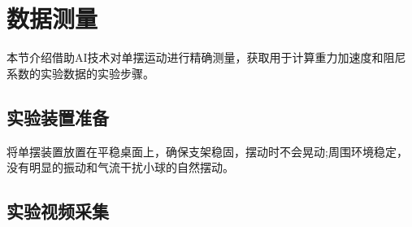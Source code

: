 \section{数据测量}


本节介绍借助AI技术对单摆运动进行精确测量，获取用于计算重力加速度和阻尼系数的实验数据的实验步骤。

\subsection{实验装置准备}

将单摆装置放置在平稳桌面上，确保支架稳固，摆动时不会晃动;周围环境稳定，没有明显的振动和气流干扰小球的自然摆动。

\subsection{实验视频采集}

